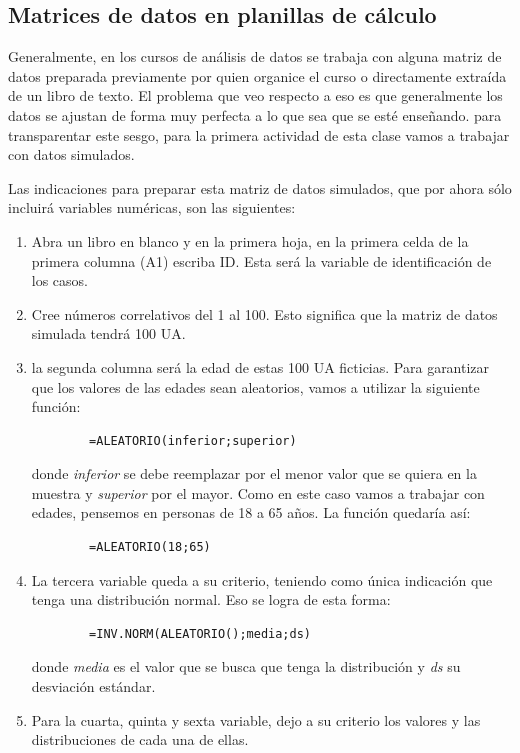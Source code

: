 \documentclass[letterpaper,11pt]{article}
\begin{document}
 \subsection{Matrices de datos en planillas de cálculo}
 
 Generalmente, en los cursos de análisis de datos se trabaja con alguna matriz de datos preparada previamente por quien organice el curso o directamente extraída de un libro de texto. El problema que veo respecto a eso es que generalmente los datos se ajustan de forma muy perfecta a lo que sea que se esté enseñando. para transparentar este sesgo, para la primera actividad de esta clase vamos a trabajar con datos simulados.
 
 Las indicaciones para preparar esta matriz de datos simulados, que por ahora sólo incluirá variables numéricas, son las siguientes:
 \begin{enumerate}
 	\item Abra un libro en blanco y en la primera hoja, en la primera celda de la primera columna (A1) escriba ID. Esta será la variable de identificación de los casos.
 	\item Cree números correlativos del 1 al 100. Esto significa que la matriz de datos simulada tendrá 100 UA.
 	\item la segunda columna será la edad de estas 100 UA ficticias. Para garantizar que los valores de las edades sean aleatorios, vamos a utilizar la siguiente función:
 	\begin{lstlisting}
 		=ALEATORIO(inferior;superior)
 	\end{lstlisting}
 	donde \emph{inferior} se debe reemplazar por el menor valor que se quiera en la muestra y \emph{superior} por el mayor. Como en este caso vamos a trabajar con edades, pensemos en personas de 18 a 65 años. La función quedaría así:
 	\begin{lstlisting}
 		=ALEATORIO(18;65)
 	\end{lstlisting}
 	\item La tercera variable queda a su criterio, teniendo como única indicación que tenga una distribución normal. Eso se logra de esta forma:
 	\begin{lstlisting}
 		=INV.NORM(ALEATORIO();media;ds)
 	\end{lstlisting}donde \emph{media} es el valor que se busca que tenga la distribución y \emph{ds} su desviación estándar.
 	\item Para la cuarta, quinta y sexta variable, dejo a su criterio los valores y las distribuciones de cada una de ellas. 
 \end{enumerate}
 
\end{document}
